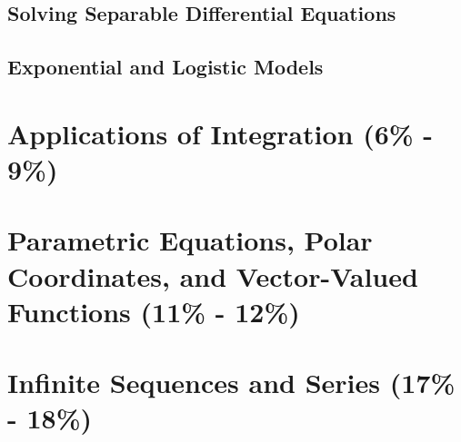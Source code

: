 \documentclass[12pt]{article}
\begin{document}
        \subsection{Solving Separable Differential Equations}

        \subsection{Exponential and Logistic Models}

    \section{Applications of Integration (6\% - 9\%)}

    \section{Parametric Equations, Polar Coordinates, and Vector-Valued Functions (11\% - 12\%)}

    \section{Infinite Sequences and Series (17\% - 18\%)}
\end{document}

